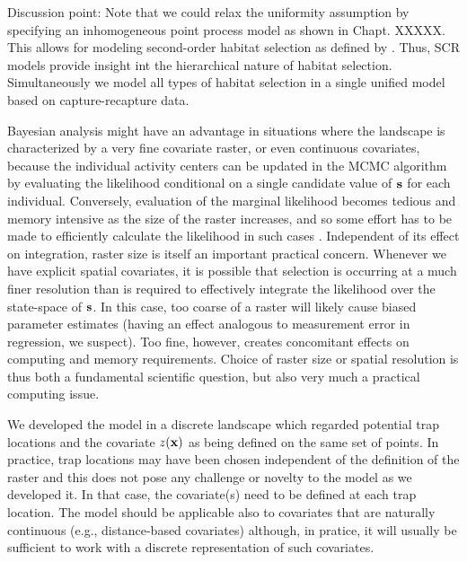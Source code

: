 Discussion point: Note that we could
relax the uniformity assumption by specifying an inhomogeneous point
process model \citep{borchers_efford:2008}
as shown in
Chapt. XXXXX.
This allows for modeling second-order habitat
selection as defined by \citet{johnson:1980}.
Thus, SCR models
provide insight int the hierarchical nature of habitat selection.
Simultaneously we model all types of habitat selection in a single
unified model based on capture-recapture data.







Bayesian analysis might have an advantage in situations where the
landscape is characterized by a very fine covariate raster, or even
continuous covariates, because the individual activity centers can be
updated in the MCMC algorithm by evaluating the likelihood conditional
on a single candidate value of ${\bf s}$ for each individual.
Conversely, evaluation of the marginal likelihood becomes tedious and
memory intensive as the size of the raster increases, and so some
effort has to be made to efficiently calculate the likelihood in such
cases \citep[e.g., see][]{warton_shepherd:2010}. Independent of its
effect on integration, raster size is itself an important practical
concern.
Whenever we have explicit spatial covariates, it is possible that
selection is occurring at a much finer resolution than is required to
effectively integrate the likelihood over the state-space of ${\bf
  s}$. In this case, too coarse of a raster will likely cause biased
parameter estimates (having an effect analogous to measurement error
in regression, we suspect). Too fine, however, creates concomitant
effects on computing and memory requirements.  Choice of raster size
or spatial resolution is thus both a fundamental scientific question,
but also very much a practical computing issue.

We developed the model in a discrete landscape which regarded
potential trap
locations and the covariate $z({\bf x})$ as being defined on the same
set of points. In practice, trap locations may have been chosen
independent of the definition of the raster and this does not pose any
challenge or novelty to the model as we developed it. In that 
case, the covariate(s) need to be defined  at each trap location. 
The model should be applicable also to covariates that are naturally
continuous (e.g., distance-based covariates) although, in pratice, it
will usually be sufficient to work with a discrete representation of
such covariates. 



